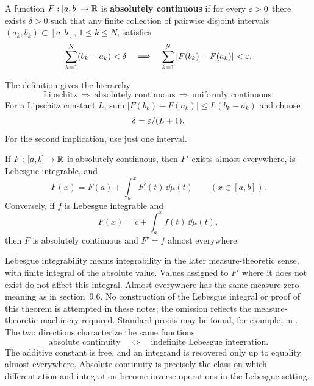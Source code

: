 \begin{definition}
\label{def:absolute-continuity}
A function $F:[a,b]\to\mathbb{R}$ is \textbf{absolutely continuous} if for every
$\varepsilon>0$ there exists $\delta>0$ such that any finite collection of
pairwise disjoint intervals $(a_k,b_k)\subset[a,b]$, $1\leq k\leq N$,
satisfies
\[
\sum_{k=1}^N(b_k-a_k)<\delta
\quad\Longrightarrow\quad
\sum_{k=1}^N|F(b_k)-F(a_k)|<\varepsilon.
\]
\end{definition}
The definition gives the hierarchy
\[
\text{Lipschitz}\ \Longrightarrow\ \text{absolutely continuous}
\ \Longrightarrow\ \text{uniformly continuous}.
\]
For a Lipschitz constant $L$, sum $|F(b_k)-F(a_k)|\leq L(b_k-a_k)$
and choose
\[
\delta=\varepsilon/(L+1).
\]
 For the second implication, use just
one interval.

\begin{theorem}
\label{thm:lebesgue-ftc-preview}
If $F:[a,b]\to\mathbb{R}$ is absolutely continuous, then $F'$ exists almost
everywhere, is Lebesgue integrable, and
\[
F(x)=F(a)+\int_a^x F'(t)\,\dd\mu(t)\qquad(x\in[a,b]).
\]
Conversely, if $f$ is Lebesgue integrable and
\[
F(x)=c+\int_a^x f(t)\,\dd\mu(t),
\]
then $F$ is absolutely continuous and $F'=f$ almost everywhere.
\end{theorem}
Lebesgue integrability means integrability in the later measure-theoretic
sense, with finite integral of the absolute value. Values assigned to
$F'$ where it does not exist do not affect this integral. Almost everywhere has the same measure-zero meaning as in section~9.6. No construction of the Lebesgue
integral or proof of this theorem is attempted in these notes; the omission
reflects the measure-theoretic machinery required.
Standard proofs may be found, for example, in
\cite{pugh-analysis,rudin-pma}.
The two directions characterize the same functions:
\[
\boxed{\text{absolute continuity}
\quad\Longleftrightarrow\quad\text{indefinite Lebesgue integration}.}
\]
The additive constant is free, and an integrand is recovered only up to
equality almost everywhere.
Absolute continuity is precisely the class on which differentiation and
integration become inverse operations in the Lebesgue setting.

